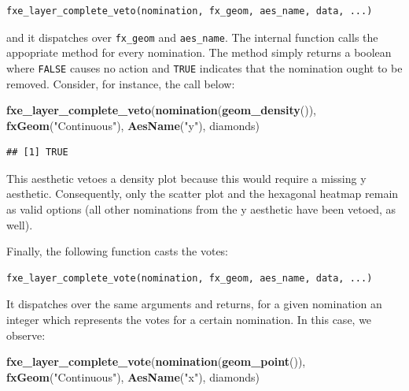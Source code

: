 \documentclass[]{report}
\newenvironment{Shaded}{\begin{snugshade}}{\end{snugshade}}
\newcommand{\KeywordTok}[1]{\textcolor[rgb]{0.13,0.29,0.53}{\textbf{#1}}}
\newcommand{\StringTok}[1]{\textcolor[rgb]{0.31,0.60,0.02}{#1}}
\newcommand{\NormalTok}[1]{#1}
\theoremstyle{definition}
\theoremstyle{definition}
\theoremstyle{definition}
\theoremstyle{remark}
\begin{document}
\begin{verbatim}
fxe_layer_complete_veto(nomination, fx_geom, aes_name, data, ...)
\end{verbatim}

and it dispatches over \texttt{fx\_geom} and \texttt{aes\_name}. The
internal function calls the appopriate method for every nomination. The
method simply returns a boolean where \texttt{FALSE} causes no action
and \texttt{TRUE} indicates that the nomination ought to be removed.
Consider, for instance, the call below:

\begin{Shaded}
\begin{Highlighting}[]
\KeywordTok{fxe_layer_complete_veto}\NormalTok{(}\KeywordTok{nomination}\NormalTok{(}\KeywordTok{geom_density}\NormalTok{()), }\KeywordTok{fxGeom}\NormalTok{(}\StringTok{"Continuous"}\NormalTok{), }\KeywordTok{AesName}\NormalTok{(}\StringTok{"y"}\NormalTok{), diamonds)}
\end{Highlighting}
\end{Shaded}

\begin{verbatim}
## [1] TRUE
\end{verbatim}

This aesthetic vetoes a density plot because this would require a
missing y aesthetic. Consequently, only the scatter plot and the
hexagonal heatmap remain as valid options (all other nominations from
the y aesthetic have been vetoed, as well).

Finally, the following function casts the votes:

\begin{verbatim}
fxe_layer_complete_vote(nomination, fx_geom, aes_name, data, ...)
\end{verbatim}

It dispatches over the same arguments and returns, for a given
nomination an integer which represents the votes for a certain
nomination. In this case, we observe:

\begin{Shaded}
\begin{Highlighting}[]
\KeywordTok{fxe_layer_complete_vote}\NormalTok{(}\KeywordTok{nomination}\NormalTok{(}\KeywordTok{geom_point}\NormalTok{()), }\KeywordTok{fxGeom}\NormalTok{(}\StringTok{"Continuous"}\NormalTok{), }\KeywordTok{AesName}\NormalTok{(}\StringTok{"x"}\NormalTok{), diamonds)}
\end{Highlighting}
\end{Shaded}
\end{document}

